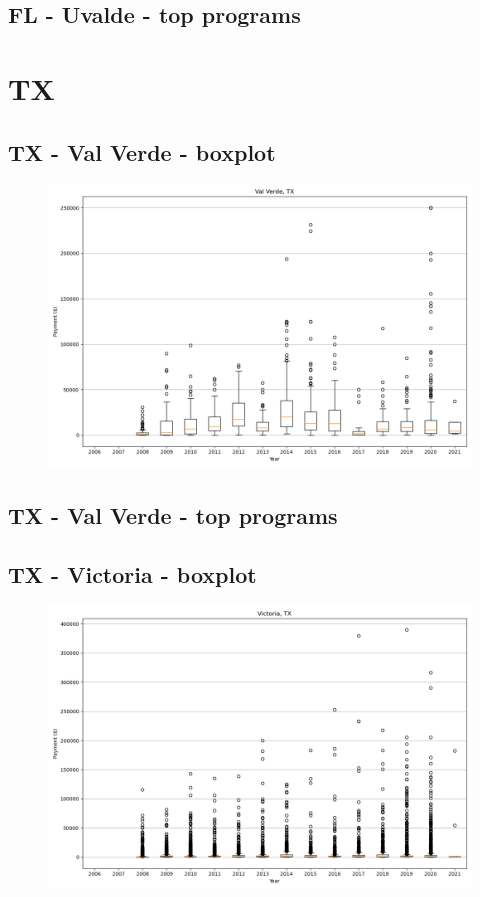 \subsection*{FL - Uvalde - top programs}

\newpage
\section*{TX}
\subsection*{TX - Val Verde - boxplot}
\begin{figure}[h]
\centering
\includegraphics[width=7in]{../output/boxplots/counties/Val Verde-TX_boxplot.png}
\end{figure}


\subsection*{TX - Val Verde - top programs}

\newpage
\subsection*{TX - Victoria - boxplot}
\begin{figure}[h]
\centering
\includegraphics[width=7in]{../output/boxplots/counties/Victoria-TX_boxplot.png}
\end{figure}


